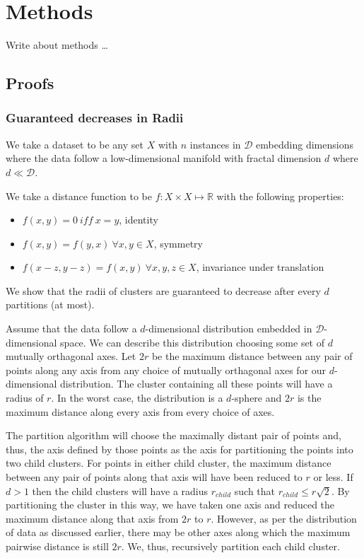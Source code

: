 \section{Methods}
\label{sec:methods}

Write about methods \dots


\subsection{Proofs}
\label{subserc:methods:proofs}

\subsubsection{Guaranteed decreases in Radii}
\label{subsubsec:methods:proofs:radii-decrease}

We take a dataset to be any set $X$ with $n$ instances in $\mathcal{D}$ embedding dimensions where the data follow a low-dimensional manifold with fractal dimension $d$ where $d \ll \mathcal{D}$.

We take a distance function to be $f: X \times X \mapsto \mathbb{R}$ with the following properties:

\begin{itemize}
    \item $f(x, y) = 0 \ iff \ x = y$, identity
    \item $f(x, y) = f(y, x) \ \forall x, y \in X$, symmetry
    \item $f(x - z, y - z) = f(x, y) \ \forall x, y, z \in X$, invariance under translation 
\end{itemize}

We show that the radii of clusters are guaranteed to decrease after every $d$ partitions (at most).

Assume that the data follow a $d$-dimensional distribution embedded in $\mathcal{D}$-dimensional space.
We can describe this distribution choosing some set of $d$ mutually orthagonal axes.
Let $2r$ be the maximum distance between any pair of points along any axis from any choice of mutually orthagonal axes for our $d$-dimensional distribution.
The cluster containing all these points will have a radius of $r$.
In the worst case, the distribution is a $d$-sphere and $2r$ is the maximum distance along every axis from every choice of axes.

The partition algorithm will choose the maximally distant pair of points and, thus, the axis defined by those points as the axis for partitioning the points into two child clusters.
For points in either child cluster, the maximum distance between any pair of points along that axis will have been reduced to $r$ or less.
If $d > 1$ then the child clusters will have a radius $r_{child}$ such that $r_{child} \leq r \sqrt{2}$.
By partitioning the cluster in this way, we have taken one axis and reduced the maximum distance along that axis from $2r$ to $r$.
However, as per the distribution of data as discussed earlier, there may be other axes along which the maximum pairwise distance is still $2r$.
We, thus, recursively partition each child cluster.

